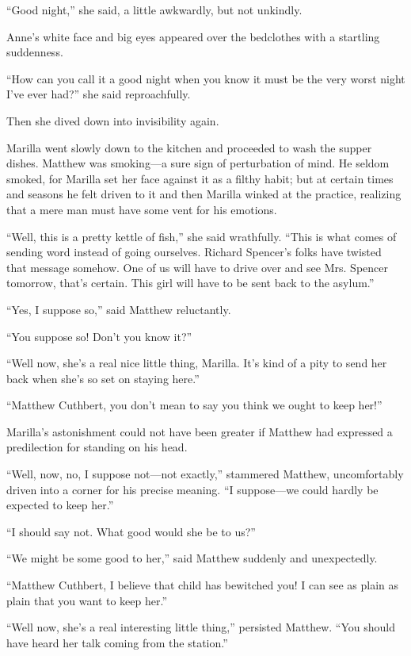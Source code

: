 \documentclass[a4paper]{article}
\begin{document}
\footnotesize{``Good night,'' she said, a little awkwardly, but not unkindly.

Anne's white face and big eyes appeared over the bedclothes with a startling suddenness.

``How can you call it a good night when you know it must be the very worst night I've ever had?'' she said reproachfully.

Then she dived down into invisibility again.}

\small{Marilla went slowly down to the kitchen and proceeded to wash the supper dishes. Matthew was smoking---a sure sign of perturbation of mind. He seldom smoked, for Marilla set her face against it as a filthy habit; but at certain times and seasons he felt driven to it and then Marilla winked at the practice, realizing that a mere man must have some vent for his emotions.

``Well, this is a pretty kettle of fish,'' she said wrathfully. ``This is what comes of sending word instead of going ourselves. Richard Spencer's folks have twisted that message somehow. One of us will have to drive over and see Mrs. Spencer tomorrow, that's certain. This girl will have to be sent back to the asylum.''}

\normalsize{``Yes, I suppose so,'' said Matthew reluctantly.

``You suppose so! Don't you know it?''

``Well now, she's a real nice little thing, Marilla. It's kind of a pity to send her back when she's so set on staying here.''

``Matthew Cuthbert, you don't mean to say you think we ought to keep her!''

Marilla's astonishment could not have been greater if Matthew had expressed a predilection for standing on his head.}

\large{``Well, now, no, I suppose not---not exactly,'' stammered Matthew, uncomfortably driven into a corner for his precise meaning. ``I suppose---we could hardly be expected to keep her.''

``I should say not. What good would she be to us?''

``We might be some good to her,'' said Matthew suddenly and unexpectedly.

``Matthew Cuthbert, I believe that child has bewitched you! I can see as plain as plain that you want to keep her.''

``Well now, she's a real interesting little thing,'' persisted Matthew. ``You should have heard her talk coming from the station.''}
\end{document}
